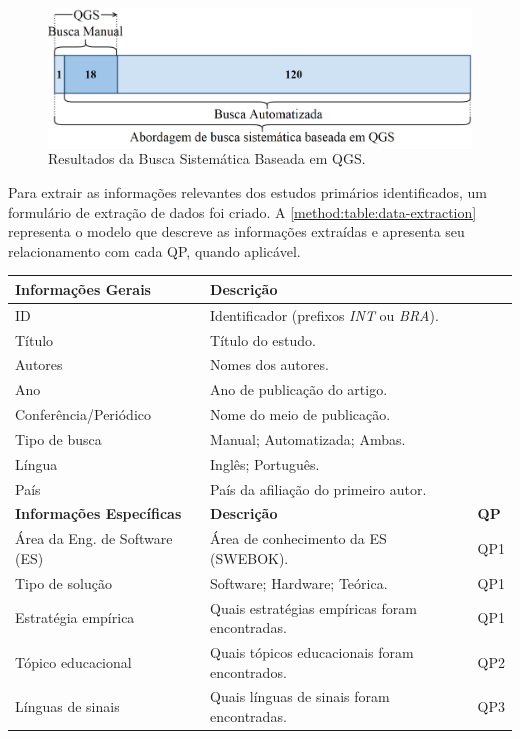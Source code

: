 \begin{figure}[htb]
\centering 
\caption{Resultados da Busca Sistemática Baseada em QGS.}
\label{method:figure:evaluation-refinement}
\includegraphics[width=.9\textwidth]{images/chapter2-sm-qgs-search.png}
\fautor
\end{figure}

Para extrair as informações relevantes dos estudos primários identificados, um formulário de extração de dados foi criado. A \autoref{method:table:data-extraction} representa o modelo que descreve as informações extraídas e apresenta seu relacionamento com cada QP, quando aplicável.


\begin{quadro}[htb]
\centering
\caption{Formulário de Extração de Dados.}
\label{method:table:data-extraction}
\begin{tabular}{l|l|l} \hline
\textbf{Informações Gerais} & \multicolumn{2}{l}{\textbf{Descrição}} \\ \hline
ID & \multicolumn{2}{l}{Identificador (prefixos \textit{INT} ou \textit{BRA}).} \\
Título & \multicolumn{2}{l}{Título do estudo.} \\
Autores & \multicolumn{2}{l}{Nomes dos autores.} \\
Ano & \multicolumn{2}{l}{Ano de publicação do artigo.} \\
Conferência/Periódico & \multicolumn{2}{l}{Nome do meio de publicação.} \\
Tipo de busca & \multicolumn{2}{l}{Manual; Automatizada; Ambas.} \\
Língua & \multicolumn{2}{l}{Inglês; Português.} \\
País & \multicolumn{2}{l}{País da afiliação do primeiro autor.} \\ \hline
\textbf{Informações Específicas} & \textbf{Descrição} & \textbf{QP} \\ \hline
Área da Eng. de Software (ES) & Área de conhecimento da ES (SWEBOK). & QP1 \\
Tipo de solução & Software; Hardware; Teórica. & QP1 \\
Estratégia empírica & Quais estratégias empíricas foram encontradas. & QP1 \\
Tópico educacional & Quais tópicos educacionais foram encontrados. & QP2 \\
Línguas de sinais & Quais línguas de sinais foram encontradas. & QP3 \\ \hline
\end{tabular}
\end{quadro}

